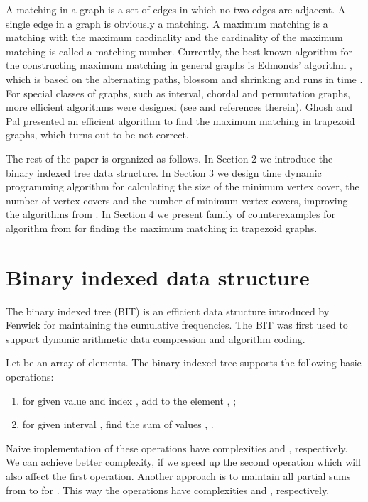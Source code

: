 \documentclass[11pt,letter]{article}
\begin{document}
A matching in a graph is a set of edges in which no two edges are adjacent. A single edge in a
graph is obviously a matching. A maximum matching is a matching with the maximum cardinality and
the cardinality of the maximum matching is called a matching number. Currently, the best known
algorithm for the constructing maximum matching in general graphs is Edmonds' algorithm
\cite{Ga80,MiVa80}, which is based on the alternating paths, blossom and shrinking and runs in time
. For special classes of graphs, such as interval, chordal and permutation
graphs, more efficient algorithms were designed (see \cite{AnAtChLe00,Ch96,ChPaCh97} and references
therein). Ghosh and Pal \cite{GhPa05} presented an efficient algorithm to find the maximum matching
in trapezoid graphs, which turns out to be not correct.

The rest of the paper is organized as follows. In Section 2 we introduce the binary indexed tree
data structure. In Section 3 we design  time dynamic programming algorithm for
calculating the size of the minimum vertex cover, the number of vertex covers and the number of
minimum vertex covers, improving the algorithms from \cite{LiCh09}. In Section 4 we present family
of counterexamples for  algorithm from \cite{GhPa05} for finding the maximum matching in
trapezoid graphs.



\section{Binary indexed data structure}


The binary indexed tree (BIT) is an efficient data structure introduced by Fenwick \cite{Fe94} for
maintaining the cumulative frequencies. The BIT was first used to support dynamic arithmetic data
compression and algorithm coding.

Let  be an array of  elements. The binary indexed tree supports the following basic
operations:
\begin{enumerate}[()]
\item for given value  and index , add  to the element , ;
\item for given interval , find the sum of values , .
\end{enumerate}



Naive implementation of these operations have complexities  and , respectively. We can
achieve better complexity, if we speed up the second operation which will also affect the first
operation. Another approach is to maintain all partial sums from  to  for . This way the operations have complexities  and , respectively.
\end{document}

